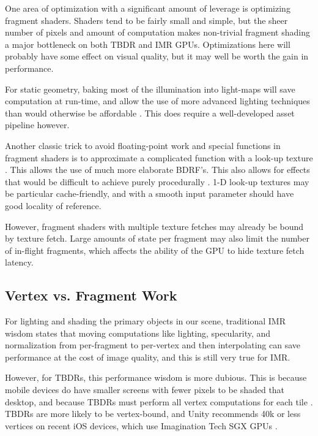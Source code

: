 One area of optimization with a significant amount of leverage is optimizing
fragment shaders.  Shaders tend to be fairly small and simple, but the sheer
number of pixels and amount of computation makes non-trivial fragment shading a
major bottleneck on both TBDR and IMR GPUs.  Optimizations here will probably
have some effect on visual quality, but it may well be worth the gain in
performance.

For static geometry, baking most of the illumination into light-maps will save
computation at run-time, and allow the use of more advanced lighting techniques
than would otherwise be affordable \cite{Miller99} \cite{Unity11}.
This does require a well-developed asset pipeline however.

Another classic trick to avoid floating-point work and special functions in
fragment shaders is to approximate a complicated function with a look-up
texture \cite{Pranckevicius11b}.  This allows the use of much more elaborate
BDRF's.  This also allows for effects that would be difficult to achieve purely
procedurally \cite{Mitchell07}.  1-D look-up textures may be particular
cache-friendly, and with a smooth input parameter should have good locality of
reference.  

However, fragment shaders with multiple texture fetches may already be bound by
texture fetch.  Large amounts of state per fragment may also limit the number
of in-flight fragments, which affects the ability of the GPU to hide texture
fetch latency.

\subsection{Vertex vs. Fragment Work}
\label{Jon-McCaffrey-Vertex-vs-Fragment-Work}

For lighting and shading the primary objects in our scene, traditional IMR
wisdom states that moving computations like lighting, specularity, and
normalization from per-fragment to per-vertex and then interpolating can save
performance at the cost of image quality, and this is still very true for IMR.

However, for TBDRs, this performance wisdom is more dubious.  This is because
mobile devices do have smaller screens with fewer pixels to be shaded that
desktop, and because TBDRs must perform all vertex computations for each tile
\cite{Apple11}.  TBDRs are more likely to be vertex-bound, and Unity
recommends 40k or less vertices on recent iOS devices, which use Imagination
Tech SGX GPUs \cite{Unity11}.

